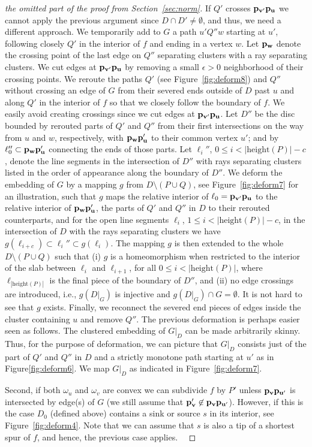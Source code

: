 \documentclass{llncs}
\def\qed{ \ \vrule width.2cm height.2cm depth0cm\smallskip}
\def\length{\mathrm{height}}
\begin{document}
\begin{proof}[the omitted part of the proof from Section~\ref{sec:norm}]
If $Q'$ crosses ${\bf p_{v'}p_u}$ we cannot apply the previous argument since $D \cap D' \not=\emptyset$,
and thus, we need a different approach.
We temporarily add to $G$ a path $u'Q''w$ starting at $u'$, following closely $Q'$ in the interior of $f$
and ending in a vertex $w$. Let ${\bf p_w}$ denote the crossing point of the last edge on $Q''$
separating clusters with a ray separating clusters. 
We cut edges at ${\bf p_{v'}p_u}$ by removing a small $\epsilon>0$ neighborhood of their crossing points.
We reroute the paths $Q'$  (see Figure~\ref{fig:deform8}) and $Q''$ without crossing an edge of $G$ from their severed ends outside of $D$ past $u$ and along $Q'$ in the interior of $f$ so that we closely follow the boundary of $f$.
We  easily avoid creating crossings since we cut edges at ${\bf p_{v'}p_u}$.
Let $D''$  be the disc bounded by rerouted parts of $Q'$ and $Q''$ from their first intersections on the way from $u$ and $w$, respectively, with ${\bf p_wp_{u}'}$ to their common vertex $u'$; and by $\ell_0''\subset {\bf p_wp_{u}'}$ connecting the ends of those parts.
Let $\ell_i''$, $0\leq i < |\length(P)|-c$, denote the line segments in the intersection of $D''$ with rays separating clusters listed in the order of appearance along the boundary of $D''$.
We deform the embedding of $G$ by a mapping $g$ from $D\setminus (P \cup Q)$, see Figure~\ref{fig:deform7} for an illustration, such that $g$ maps the relative interior of $\ell_0={\bf p_{v'}p_u}$ to the relative interior of  ${\bf p_wp_{u}'}$, the parts of $Q'$ and $Q''$ in $D$ to their rerouted counterparts, and for the open line segments $\ell_i$, $1\leq i <|\length(P)|-c$, in the intersection of $D$ with the rays separating clusters we have $g(\ell_{i+c})\subset \ell_i'' \subset g(\ell_i)$.
The mapping $g$ is then extended to the whole $D\setminus (P \cup Q)$ such that (i) $g$ is a homeomorphism when restricted to the interior
of the slab between $\ell_i$ and $\ell_{i+1}$, for all $0\le i<|\length(P)|$, where $\ell_{|\length(P)|}$ is the 
final piece of the boundary of $D''$, and (ii) no edge crossings are introduced, i.e., $g(D|_{G})$ is injective
and $g(D|_{G}) \cap G =\emptyset$. It is not hard to see that $g$ exists. Finally, we reconnect the severed end pieces of edges inside the cluster
containing $u$ and remove $Q''$.
The previous deformation is perhaps easier seen as follows. The clustered embedding of $G|_{D}$ can be made  arbitrarily skinny. Thus, for the purpose of  deformation, we can picture that $G|_{D}$ consists just of the part of $Q'$ and $Q''$ in $D$ and a strictly monotone 
path starting at  $u'$ as in Figure\ref{fig:deform6}. We map $G|_{D}$ as indicated in Figure~\ref{fig:deform7}.
 
   
Second, if both $\omega_u$ and $\omega_v$ are convex we can subdivide $f$ by $P'$ unless ${\bf p_{v}p_{u'}}$ is intersected by edge(s) of $G$ (we still assume that  ${\bf p_v'}\not\in{\bf p_{v}p_{u'}}$).
   However, if this is the case $D_0$ (defined above) contains a sink or source $s$ in its interior, see Figure~\ref{fig:deform4}. Note that we can assume that $s$ is also a tip of a shortest spur of $f$, and hence, the previous case applies.
\qed\end{proof}
\end{document}
